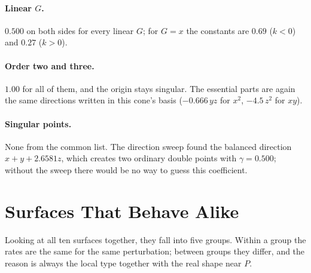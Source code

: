 \documentclass[12pt, a4paper]{article}
\theoremstyle{plain}
\theoremstyle{definition}
\theoremstyle{remark}
\theoremstyle{definition}
\begin{document}
\paragraph{Linear $G$.} $0.500$ on both sides for every linear $G$; for $G=x$ the
constants are $0.69$ ($k<0$) and $0.27$ ($k>0$).

\paragraph{Order two and three.} $1.00$ for all of them, and the origin stays
singular. The essential parts are again the same directions written in this cone's
basis ($-0.666\,yz$ for $x^2$, $-4.5\,z^2$ for $xy$).

\paragraph{Singular points.} None from the common list. The direction sweep found
the balanced direction $x+y+2.6581z$, which creates two ordinary double points with
$\gamma=0.500$; without the sweep there would be no way to guess this coefficient.
\clearpage

\section{Surfaces That Behave Alike}
\label{sec:r-groupF}

Looking at all ten surfaces together, they fall into five groups. Within a group
the rates are the same for the same perturbation; between groups they differ, and
the reason is always the local type together with the real shape near $P$.
\end{document}
